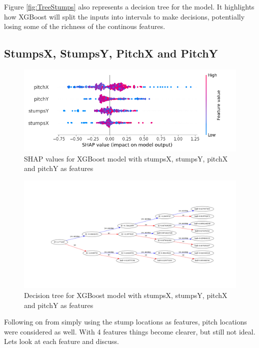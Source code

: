 \documentclass[12pt,a4paper]{report}
\theoremstyle{definition}
\begin{document}
Figure \ref{fig:TreeStumps} also represents a decision tree for the model.
It highlights how XGBoost will split the inputs into intervals to make decisions, potentially losing some of the richness of the continous features.

\subsection{StumpsX, StumpsY, PitchX and PitchY}

\begin{figure}[H]
    \centering
    \includegraphics[width=\linewidth]{shap_stumps_pitch.png}
    \caption{SHAP values for XGBoost model with stumpsX, stumpsY, pitchX and pitchY as features}
    \label{fig:ShapStumpsPitch}
\end{figure}

\begin{figure}[H]
    \centering
    \includegraphics[width=\linewidth]{tree_stumps_pitch.png}
    \caption{Decision tree for XGBoost model with stumpsX, stumpsY, pitchX and pitchY as features}
    \label{fig:TreeStumpsPitch}
\end{figure}

Following on from simply using the stump locations as features, pitch locations were considered as well.
With 4 features things become clearer, but still not ideal.
Lets look at each feature and discuss.
\end{document}
